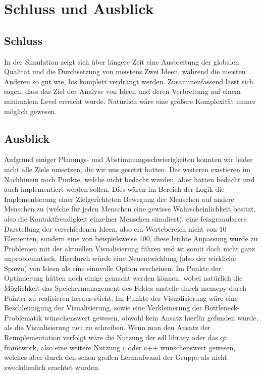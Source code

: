 \section{Schluss und Ausblick}
\subsection{Schluss}
In der Simulation zeigt sich über längere Zeit eine Ausbreitung der globalen Qualität und die Durchsetzung von meistens Zwei Ideen, während die meisten Anderen so gut wie, bis komplett verdrängt werden.
Zusammenfassend lässt sich sagen, dass das Ziel der Analyse von Ideen und deren Verbreitung auf einem minimalem Level erreicht wurde. Natürlich wäre eine größere Komplexität immer möglich gewesen.
\subsection{Ausblick}
Aufgrund einiger Planungs- und Abstimmungsschwierigkeiten konnten wir leider nicht alle Ziele umsetzen, die wir uns gesetzt hatten. 
Des weiteren existieren im Nachhinein noch Punkte, welche nicht bedacht wurden, aber hätten bedacht und auch implementiert werden sollen.
Dies wären im Bereich der Logik die Implementierung einer Zielgerichteten Bewegung der Menschen auf andere Menschen zu (welche für jeden Menschen eine gewisse Wahrscheinlichkeit besitzt, also die Kontaktfreudigkeit einzelner Menschen simuliert),
eine feingranularere Darstellung der verschiedenen Ideen, also ein Wertebereich nicht von 10 Elementen, sondern eine von beispielsweise 100, diese leichte Anpassung würde zu Problemen mit der aktuellen Visualisierung führen  und ist somit doch nicht ganz unproblematisch.
Hierdurch würde eine Neuentwicklung (also der wirkliche Spawn) von Ideen als eine sinnvolle Option erscheinen.
Im Punkte der Optimierung hätten noch einige gemacht werden können, wobei natürlich die Möglichkeit das Speichermanagement des Feldes anstelle durch memcpy durch Pointer zu realisieren heraus sticht.
Im Punkte der Visualisierung wäre eine Beschleunigung der Visualisierung, sowie eine Verkleinerung der Bottleneck-Problematik wünschenswert gewesen, obwohl kein Ansatz hierfür gefunden wurde, als die Visualisierung neu zu schreiben.
Wenn man den Ansatz der Reimplementation verfolgt wäre die Nutzung der sdl library oder das qt framework, also eine weitere Nutzung c oder c++ wünschenswert gewesen, welches aber durch den schon großen Lernaufwand der Gruppe als nicht zweckdienlich erachtet wurden.

